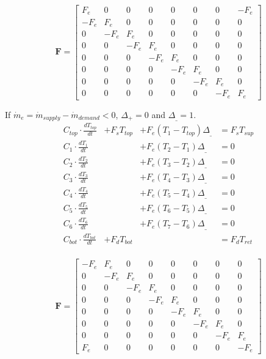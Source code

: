 \begin{scriptsize}
	\begin{equation}
		\mathbf{F} =  
		\begin{bmatrix}
			F_e & 0 & 0 & 0 & 0 & 0 & 0 & -F_e \\
			-F_e &F_e & 0 & 0 & 0 & 0 & 0 & 0 \\
			0 & -F_e & F_e & 0 & 0 & 0 & 0 & 0 \\
			0 & 0 & -F_e & F_e & 0 & 0 & 0 & 0 \\
			0 & 0 & 0 & -F_e & F_e & 0 & 0 & 0 \\
			0 & 0 & 0 & 0 & -F_e & F_e & 0 & 0 \\
			0 & 0 & 0 & 0 & 0 & -F_e & F_e & 0 \\
			0 & 0 & 0 & 0 & 0 & 0 & -F_e & F_e
		\end{bmatrix}
		\label{eq:flowmatrix}
	\end{equation}
	
	If $\dot{m}_e = \dot{m}_{supply} - \dot{m}_{demand} < 0$, $\Delta_{+} = 0$ and $ \Delta_{\_} = 1 $.
	\begin{equation}
		\begin{aligned}
			C_{top} \cdot \frac{dT_{top}}{dt} &+F_s T_{top} &+ F_e (T_1 - T_{top}) \Delta_{\_} &= F_s T_{sup}\\
			C_1 \cdot \frac{dT_1}{dt} &&+ F_e (T_2 - T_1) \Delta_{\_} &= 0 \\
			C_2 \cdot \frac{dT_2}{dt} &&+ F_e (T_3 - T_2) \Delta_{\_} &= 0 \\
			C_3 \cdot \frac{dT_3}{dt} &&+ F_e (T_4 - T_3) \Delta_{\_} &= 0 \\
			C_4 \cdot \frac{dT_4}{dt} &&+ F_e (T_5 - T_4) \Delta_{\_} &= 0 \\
			C_5 \cdot \frac{dT_5}{dt} &&+ F_e (T_6 - T_5) \Delta_{\_} &= 0 \\
			C_6 \cdot \frac{dT_6}{dt} &&+ F_e (T_7 - T_6) \Delta_{\_} &= 0 \\
			C_{bot} \cdot \frac{dT_{bot}}{dt} &+ F_d T_{bot} &&= F_d T_{ret}\\
		\end{aligned}
	\end{equation}
	
	\begin{equation}
		\mathbf{F} =  
		\begin{bmatrix}
			-F_e & F_e & 0 & 0 & 0 & 0 & 0 & 0 \\
			0 & -F_e & F_e & 0 & 0 & 0 & 0 & 0 \\
			0 & 0 & -F_e & F_e & 0 & 0 & 0 & 0 \\
			0 & 0 & 0 & -F_e & F_e & 0 & 0 & 0 \\
			0 & 0 & 0 & 0 & -F_e & F_e & 0 & 0 \\
			0 & 0 & 0 & 0 & 0 & -F_e & F_e & 0 \\
			0 & 0 & 0 & 0 & 0 & 0 & -F_e & F_e \\
			F_e & 0 & 0 & 0 & 0 & 0 & 0 & -F_e
		\end{bmatrix}
		\label{eq:flowmatrix}
	\end{equation}
	

\end{scriptsize}

